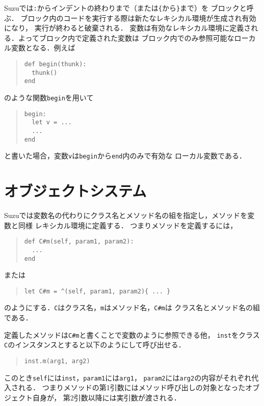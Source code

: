 \documentclass[a4paper,11pt,dvipdfmx]{jreport}
\begin{document}
Suzuでは\verb|:|からインデントの終わりまで（または\verb|{|から\verb|}|まで）を
ブロックと呼ぶ．
ブロック内のコードを実行する際は新たなレキシカル環境が生成され有効になり，
実行が終わると破棄される．
変数は有効なレキシカル環境に定義される．よってブロック内で定義された変数は
ブロック内でのみ参照可能なローカル変数となる．例えば
\begin{quote}
\begin{verbatim}
def begin(thunk):
  thunk()
end
\end{verbatim}
\end{quote}
のような関数\verb|begin|を用いて
\begin{quote}
\begin{verbatim}
begin:
  let v = ...
  ...
end
\end{verbatim}
\end{quote}
と書いた場合，変数\verb|v|は\verb|begin|から\verb|end|内のみで有効な
ローカル変数である．

\section{オブジェクトシステム}

Suzuでは変数名の代わりにクラス名とメソッド名の組を指定し，メソッドを変数と同様
レキシカル環境に定義する．
つまりメソッドを定義するには，
\begin{quote}
\begin{verbatim}
def C#m(self, param1, param2):
  ...
end
\end{verbatim}
\end{quote}
または
\begin{quote}
\begin{verbatim}
let C#m = ^(self, param1, param2){ ... }
\end{verbatim}
\end{quote}
のようにする．\verb|C|はクラス名，\verb|m|はメソッド名，\verb|C#m|は
クラス名とメソッド名の組である．

定義したメソッドは\verb|C#m|と書くことで変数のように参照できる他，
\verb|inst|をクラス\verb|C|のインスタンスとすると以下のようにして呼び出せる．
\begin{quote}
\begin{verbatim}
inst.m(arg1, arg2)
\end{verbatim}
\end{quote}
このとき\verb|self|には\verb|inst|，\verb|param1|には\verb|arg1|，
\verb|param2|には\verb|arg2|の内容がそれぞれ代入される．
つまりメソッドの第1引数にはメソッド呼び出しの対象となったオブジェクト自身が，
第2引数以降には実引数が渡される．
\end{document}
